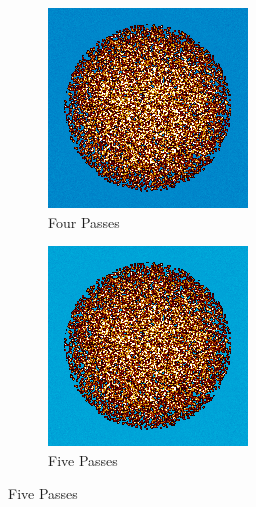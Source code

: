 \begin{figure}[H]
\begin{subfigure}{0.4\textwidth}
  \includegraphics[width=0.95\linewidth]{figures/burn-20-bstep4}
  \caption{Four Passes}
  \label{fig:bstep4}
\end{subfigure}%
%
\begin{subfigure}{0.4\textwidth}
  \includegraphics[width=0.95\linewidth]{figures/burn-20-bstep5}
  \caption{Five Passes}
  \label{fig:bstep5}
\end{subfigure}%


\end{figure}

